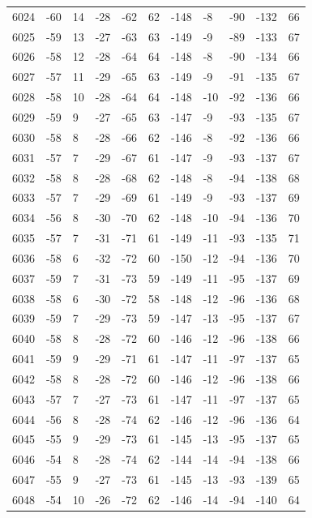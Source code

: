 \begin{table}[H]
\begin{tabular}{lllllllllll}
6024 & -60 & 14 & -28 & -62 & 62 & -148 & -8 & -90 & -132 & 66 \\
6025 & -59 & 13 & -27 & -63 & 63 & -149 & -9 & -89 & -133 & 67 \\
6026 & -58 & 12 & -28 & -64 & 64 & -148 & -8 & -90 & -134 & 66 \\
6027 & -57 & 11 & -29 & -65 & 63 & -149 & -9 & -91 & -135 & 67 \\
6028 & -58 & 10 & -28 & -64 & 64 & -148 & -10 & -92 & -136 & 66 \\
6029 & -59 & 9 & -27 & -65 & 63 & -147 & -9 & -93 & -135 & 67 \\
6030 & -58 & 8 & -28 & -66 & 62 & -146 & -8 & -92 & -136 & 66 \\
6031 & -57 & 7 & -29 & -67 & 61 & -147 & -9 & -93 & -137 & 67 \\
6032 & -58 & 8 & -28 & -68 & 62 & -148 & -8 & -94 & -138 & 68 \\
6033 & -57 & 7 & -29 & -69 & 61 & -149 & -9 & -93 & -137 & 69 \\
6034 & -56 & 8 & -30 & -70 & 62 & -148 & -10 & -94 & -136 & 70 \\
6035 & -57 & 7 & -31 & -71 & 61 & -149 & -11 & -93 & -135 & 71 \\
6036 & -58 & 6 & -32 & -72 & 60 & -150 & -12 & -94 & -136 & 70 \\
6037 & -59 & 7 & -31 & -73 & 59 & -149 & -11 & -95 & -137 & 69 \\
6038 & -58 & 6 & -30 & -72 & 58 & -148 & -12 & -96 & -136 & 68 \\
6039 & -59 & 7 & -29 & -73 & 59 & -147 & -13 & -95 & -137 & 67 \\
6040 & -58 & 8 & -28 & -72 & 60 & -146 & -12 & -96 & -138 & 66 \\
6041 & -59 & 9 & -29 & -71 & 61 & -147 & -11 & -97 & -137 & 65 \\
6042 & -58 & 8 & -28 & -72 & 60 & -146 & -12 & -96 & -138 & 66 \\
6043 & -57 & 7 & -27 & -73 & 61 & -147 & -11 & -97 & -137 & 65 \\
6044 & -56 & 8 & -28 & -74 & 62 & -146 & -12 & -96 & -136 & 64 \\
6045 & -55 & 9 & -29 & -73 & 61 & -145 & -13 & -95 & -137 & 65 \\
6046 & -54 & 8 & -28 & -74 & 62 & -144 & -14 & -94 & -138 & 66 \\
6047 & -55 & 9 & -27 & -73 & 61 & -145 & -13 & -93 & -139 & 65 \\
6048 & -54 & 10 & -26 & -72 & 62 & -146 & -14 & -94 & -140 & 64 \\

\end{tabular}
\end{table}
